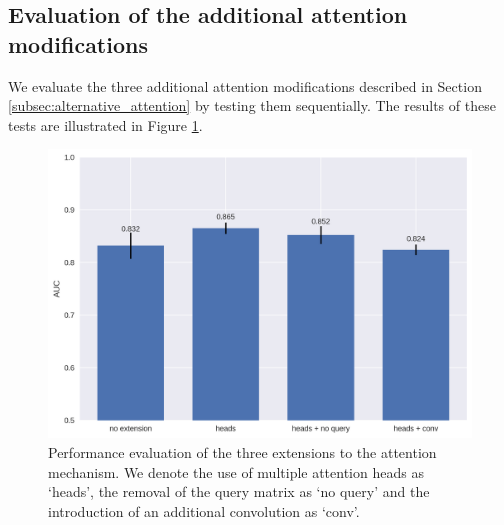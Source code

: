 \subsection{Evaluation of the additional attention modifications} \label{subsubsec:attn_hyperparams}

We evaluate the three additional attention modifications described in Section \ref{subsec:alternative_attention} by testing them sequentially. The results of these tests are illustrated in Figure \ref{fig:attn_extension_barcharts}. 

\begin{figure}
	\centering\includegraphics[width=1\textwidth]{../visualizations/ch5-results/attn_extension_barcharts.png} 
	\caption{Performance evaluation of the three extensions to the attention mechanism. We denote the use of multiple attention heads as `heads', the removal of the query matrix as `no query' and the introduction of an additional convolution as `conv'. }
	\label{fig:attn_extension_barcharts}
\end{figure}



